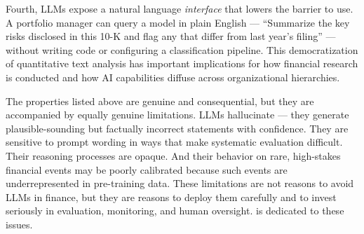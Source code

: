 Fourth, LLMs expose a natural language \emph{interface} that lowers the
barrier to use.  A portfolio manager can query a model in plain English ---
``Summarize the key risks disclosed in this 10-K and flag any that differ
from last year's filing'' --- without writing code or configuring a
classification pipeline.  This democratization of quantitative text
analysis has important implications for how financial research is
conducted and how AI capabilities diffuse across organizational
hierarchies.

\begin{remark}
\label{rem:llm-limitations-preview}
The properties listed above are genuine and consequential, but they
are accompanied by equally genuine limitations.  LLMs hallucinate
--- they generate plausible-sounding but factually incorrect statements
with confidence.  They are sensitive to prompt wording in ways that
make systematic evaluation difficult.  Their reasoning processes are
opaque.  And their behavior on rare, high-stakes financial events may
be poorly calibrated because such events are underrepresented in
pre-training data.  These limitations are not reasons to avoid LLMs
in finance, but they are reasons to deploy them carefully and to
invest seriously in evaluation, monitoring, and human oversight.
 is dedicated to these issues.
\end{remark}

